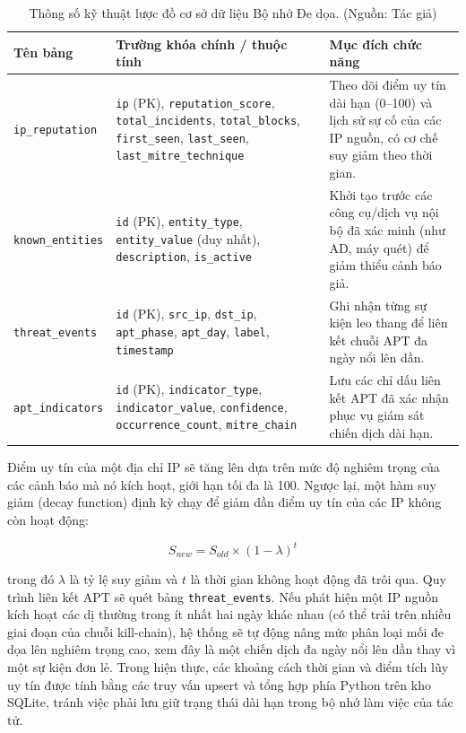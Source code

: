 \begin{table}[!htbp]
    \centering
    \caption{Thông số kỹ thuật lược đồ cơ sở dữ liệu Bộ nhớ Đe dọa. (Nguồn: Tác giả)}
    \label{tab:threat_memory_schema}
    \begin{tabular}{|>{\raggedright\arraybackslash}p{}|>{\raggedright\arraybackslash}p{}|>{\raggedright\arraybackslash}p{}|}
        \hline
        \textbf{Tên bảng} & \textbf{Trường khóa chính / thuộc tính} & \textbf{Mục đích chức năng} \\
        \hline
        \texttt{ip\_reputation} & \texttt{ip} (PK), \texttt{reputation\_score}, \texttt{total\_incidents}, \texttt{total\_blocks}, \texttt{first\_seen}, \texttt{last\_seen}, \texttt{last\_mitre\_technique} & Theo dõi điểm uy tín dài hạn (0--100) và lịch sử sự cố của các IP nguồn, có cơ chế suy giảm theo thời gian. \\
        \hline
        \texttt{known\_entities} & \texttt{id} (PK), \texttt{entity\_type}, \texttt{entity\_value} (duy nhất), \texttt{description}, \texttt{is\_active} & Khởi tạo trước các công cụ/dịch vụ nội bộ đã xác minh (như AD, máy quét) để giảm thiểu cảnh báo giả. \\
        \hline
        \texttt{threat\_events} & \texttt{id} (PK), \texttt{src\_ip}, \texttt{dst\_ip}, \texttt{apt\_phase}, \texttt{apt\_day}, \texttt{label}, \texttt{timestamp} & Ghi nhận từng sự kiện leo thang để liên kết chuỗi APT đa ngày nổi lên dần. \\
        \hline
        \texttt{apt\_indicators} & \texttt{id} (PK), \texttt{indicator\_type}, \texttt{indicator\_value}, \texttt{confidence}, \texttt{occurrence\_count}, \texttt{mitre\_chain} & Lưu các chỉ dấu liên kết APT đã xác nhận phục vụ giám sát chiến dịch dài hạn. \\
        \hline
    \end{tabular}
\end{table}

Điểm uy tín của một địa chỉ IP sẽ tăng lên dựa trên mức độ nghiêm trọng của các cảnh báo mà nó kích hoạt, giới hạn tối đa là 100. Ngược lại, một hàm suy giảm (decay function) định kỳ chạy để giảm dần điểm uy tín của các IP không còn hoạt động:

\begin{equation}
    S_{new} = S_{old} \times (1 - \lambda)^{t}
\end{equation}

trong đó $\lambda$ là tỷ lệ suy giảm và $t$ là thời gian không hoạt động đã trôi qua. Quy trình liên kết APT sẽ quét bảng \texttt{threat\_events}. Nếu phát hiện một IP nguồn kích hoạt các dị thường trong ít nhất hai ngày khác nhau (có thể trải trên nhiều giai đoạn của chuỗi kill-chain), hệ thống sẽ tự động nâng mức phân loại mối đe dọa lên nghiêm trọng cao, xem đây là một chiến dịch đa ngày nổi lên dần thay vì một sự kiện đơn lẻ. Trong hiện thực, các khoảng cách thời gian và điểm tích lũy uy tín được tính bằng các truy vấn upsert và tổng hợp phía Python trên kho SQLite, tránh việc phải lưu giữ trạng thái dài hạn trong bộ nhớ làm việc của tác tử.

